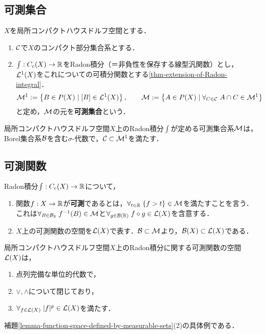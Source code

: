 \documentclass[uplatex,dvipdfmx]{jsreport}
\begin{document}
\subsection{可測集合}

\begin{definition}\label{def-measurable-sets}
    $X$を局所コンパクトハウスドルフ空間とする．
    \begin{enumerate}
        \item $\mathcal{C}$で$X$のコンパクト部分集合系とする．
        \item $\int:C_c(X)\to\mathbb{R}$をRadon積分（＝非負性を保存する線型汎関数）とし，$\mathcal{L}^1(X)$をこれについての可積分関数とする\ref{thm-extension-of-Radon-integral}．
        \[\mathcal{M}^1:=\left\{B\in P(X)\mid [B]\in\mathcal{L}^1(X)\right\},\qquad\mathcal{M}:=\left\{A\in P(X)\mid\forall_{C\in\mathcal{C}}\;A\cap C\in\mathcal{M}^1\right\}\]
        と定め，$\mathcal{M}$の元を\textbf{可測集合}という．
    \end{enumerate}
\end{definition}

\begin{proposition}
    局所コンパクトハウスドルフ空間$X$上のRadon積分$\int$が定める可測集合系$\mathcal{M}$は，Borel集合系$\mathcal{B}$を含む$\sigma$-代数で，$\mathcal{C}\subset\mathcal{M}^1$を満たす．
\end{proposition}

\subsection{可測関数}

\begin{definition}\label{def-measurable-function}
    Radon積分$\int:C_c(X)\to\mathbb{R}$について，
    \begin{enumerate}
        \item 関数$f:X\to\mathbb{R}$が\textbf{可測}であるとは，$\forall_{t\in\mathbb{R}}\;\{f>t\}\in\mathcal{M}$を満たすことを言う．これは$\forall_{B\in\mathcal{B}_{\mathbb{R}}}\;f^{-1}(B)\in\mathcal{M}$と$\forall_{g\in\mathcal{B}(\mathbb{R})}\;f\circ g\in\mathcal{L}(X)$を含意する．
        \item $X$上の可測関数の空間を$\mathcal{L}(X)$で表す．$\mathcal{B}\subset\mathcal{M}$より，$\mathcal{B}(X)\subset\mathcal{L}(X)$である．
    \end{enumerate}
\end{definition}

\begin{proposition}
    局所コンパクトハウスドルフ空間$X$上のRadon積分に関する可測関数の空間$\mathcal{L}(X)$は，
    \begin{enumerate}
        \item 点列完備な単位的代数で，
        \item $\lor,\land$について閉じており，
        \item $\forall_{f\in\mathcal{L}(X)}\;\lvert f\rvert^p\in\mathcal{L}(X)$を満たす．
    \end{enumerate}
\end{proposition}
\begin{Proof}
    補題\ref{lemma-function-space-defined-by-measurable-sets}(2)の具体例である．
\end{Proof}
\end{document}
